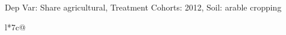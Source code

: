 \begin{table}[H]
\captionlistentry[table]{}
\label{table:beaver_land_class_DVis_land_class_1_SCg1_SSAC}
\scriptsize %
Dep Var: Share agricultural, Treatment Cohorts: 2012, Soil: arable cropping \\
\begin{threeparttable}
\begin{tabulary}{\textwidth}{l*{7}{c}@{}}
\toprule \toprule
\noalign{\smallskip}
\noalign{\smallskip}
\midrule \bottomrule
\end{tabulary}
\medskip
\end{threeparttable}
\end{table}
